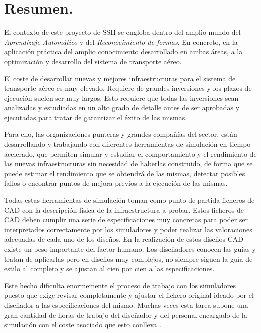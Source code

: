 \section{Resumen.}

El contexto de este proyecto de SSII se engloba dentro del amplio mundo del \textit{Aprendizaje Automático} y del \textit{Reconocimiento de formas}. En concreto, en la aplicación práctica del amplio conocimiento desarrollado en ambas áreas, a la optimización y desarrollo del sistema de transporte aéreo.

El coste de desarrollar nuevas y mejores infraestructuras para el sistema de transporte aéreo es muy elevado. Requiere de grandes inversiones y los plazos de ejecución suelen ser muy largos. Esto requiere que todas las inversiones sean analizadas y estudiadas en un alto grado de detalle antes de ser aprobadas y ejecutadas para tratar de garantizar el éxito de las mismas.

Para ello, las organizaciones punteras y grandes compañías del sector, están desarrollando y trabajando con diferentes herramientas de simulación en tiempo acelerado, que permiten simular y estudiar el comportamiento y el rendimiento de las nuevas infraestructuras sin necesidad de haberlas construido, de forma que se puede estimar el rendimiento que se obtendrá de las mismas, detectar posibles fallos o encontrar puntos de mejora previos a la ejecución de las mismas.

Todas estas herramientas de simulación toman como punto de partida ficheros de CAD \cite{CAD} con la descripción física de la infraestructura a probar. Estos ficheros de CAD deben cumplir una serie de especificaciones muy concretas para poder ser interpretados correctamente por los simuladores y poder realizar las valoraciones adecuadas de cada uno de los diseños. En la realización de estos diseños CAD existe un peso importante del factor humano. Los diseñadores conocen las guías y tratan de aplicarlas pero en diseños muy complejos, no siempre siguen la guía de estilo al completo y se ajustan al cien por cien a las especificaciones. 

Este hecho dificulta enormemente el proceso de trabajo con los simuladores puesto que exige revisar completamente y ajustar el fichero original ideado por el diseñador a las especificaciones del mismo. Muchas veces esta tarea supone una gran cantidad de horas de trabajo del diseñador y del personal encargado de la simulación con el coste asociado que esto conlleva \cite{Mariscal-2005}.

